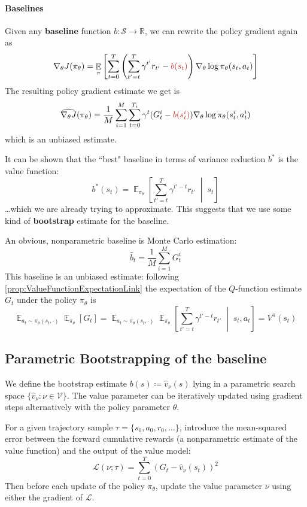 \documentclass[12pt]{report}
\newcommand\RR{\mathbb{R}}
\newcommand{\scalemid}{\;\middle|\;}
\DeclareMathOperator{\EE}{\mathbb{E}}
\newcommand{\calS}{\mathcal{S}}
\newcommand{\calL}{\mathcal{L}}
\newcommand{\redfont}{\color{darkred}}
\newcommand{\bluefont}{\color{Blue}}
\begin{document}
\paragraph{Baselines} Given any \textbf{\bluefont baseline} function $b\colon \calS \to \RR$, we can rewrite the policy gradient again as
\begin{equation}
	\nabla_\theta J(\pi_\theta) =
	\EE_\pi \left[
	\sum_{t=0}^T
	\left(
		\sum_{t'=t}^T \gamma^{t'} r_{t'} - {\redfont b(s_t)}
	\right)
	\nabla_\theta \log\pi_\theta(s_t, a_t)
	\right]
\end{equation}
The resulting policy gradient estimate we get is
\begin{equation}\label{eq:MCPolicyGradBaseline}
	\widehat{\nabla_\theta J}(\pi_\theta) =
	\frac{1}{M}\sum_{i=1}^M
	\sum_{t=0}^{T_i}
	\gamma^t (G^i_t - {\redfont b(s^i_t)})
	\nabla_\theta \log\pi_\theta (s_t^i, a_t^i)
\end{equation}
which is an unbiased estimate.

It can be shown that the ``best" baseline in terms of variance reduction $b^*$ is the value function:
\[
	b^*(s_t) = \EE_{\pi_\theta}\left[\sum_{t'=t}^T \gamma^{t'-t} r_{t'} \scalemid s_t \right]
\]
\ldots which we are already trying to approximate. This suggests that we use some kind of \textbf{bootstrap} estimate for the baseline.

An obvious, nonparametric baseline is Monte Carlo estimation:
\[
	\widehat{b}_t =
	\frac{1}{M}\sum_{i=1}^M G^i_t
\]
This baseline is an unbiased estimate: following \cref{prop:ValueFunctionExpectationLink} the expectation of the $Q$-function estimate $G_t$ under the policy $\pi_\theta$ is
\[
	\EE_{a_t\sim \pi_\theta(s_t,\cdot)}
	\EE_{\pi_\theta}
	\left[G_t\right] =
	\EE_{a_t\sim\pi_\theta(s_t,\cdot)}
	\EE_{\pi_\theta}
	\left[
	\sum_{t'=t}^T \gamma^{t'-t}r_{t'}
	\scalemid s_t,a_t
	\right] = V^\pi(s_t)
\]


\subsection{Parametric Bootstrapping of the baseline}\label{sec:REINFORCEparametricBaseline}

We define the bootstrap estimate $b(s) \coloneqq \widehat{v}_\nu(s)$ lying in a parametric search space $\{\widehat{v}_\nu : \nu \in \mathcal{V}\}$. The value parameter can be iteratively updated using gradient steps alternatively with the policy parameter $\theta$.

For a given trajectory sample $\tau=\{s_0,a_0,r_0,\ldots\}$, introduce the mean-squared error between the forward cumulative rewards (a nonparametric estimate of the value function) and the output of the value model:
\[
	\calL(\nu; \tau) =
	\sum_{t=0}^{T} \left(G_t
	- \widehat{v}_\nu(s_t)
	\right)^2
\]
Then before each update of the policy $\pi_\theta$, update the value parameter $\nu$ using either the gradient of $\calL$.
\end{document}
